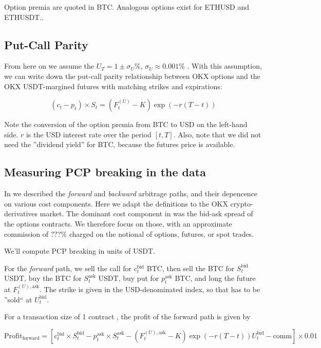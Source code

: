 \documentclass[12pt]{article}
\begin{document}
Option premia are quoted in BTC. Analogous options exist for ETHUSD and ETHUSDT.\citet{okx_options}.

\subsection{Put-Call Parity}

From here on we assume the $U_T=1 \pm \sigma_U\%$, $\sigma_U\approx0.001\%$ \citet{usd_vs_usdt}. With this assumption, we can write down the put-call parity relationship between OKX options and the OKX USDT-margined futures with matching strikes and expirations:

\begin{equation}
(c_t - p_t)\times S_t = (F^{(U)}_t - K)\exp\left(-r(T-t)\right)
\end{equation}

Note the conversion of the option premia from BTC to USD on the left-hand side. $r$ is the USD interest rate over the period $[t,T]$. Also, note that we did not need the ''dividend yield'' for BTC, because the futures price is available.


\subsection{Measuring PCP breaking in the data}

In \citet{pcpb_frl1} we described the \textit{forward} and \textit{backward} arbitrage paths, and their depencence on various cost components. Here we adapt the definitions to the OKX crypto-derivatives market. The dominant cost component in \citet{pcpb_frl1} was the bid-ask spread of the options contracts. We therefore focus on those, with an approximate commission of $???\%$ charged on the notional of options, futures, or spot trades.

We'll compute PCP breaking in units of USDT.

For the \textit{forward} path, we sell the call for $c_t^\text{bid}$ BTC, then sell the BTC for $S_t^\text{bid}$ USDT, buy the BTC for $S_t^\text{ask}$ USDT, buy put for $p_t^\text{ask}$ BTC, and long the future at $F^{(U),\text{ask}}_t$. The strike is given in the USD-denominated index, so that has to be ''sold`` at $U_t^\text{bid}$.

For a transaction size of 1 contract , the profit of the forward path is given by

\begin{equation}
    \text{Profit}_\text{forward} = \left[ c_t^\text{bid}\times S_t^\text{bid} - p_t^\text{ask}\times S_t^\text{ask} - (F^{(U),\text{ask}}_t - K)\exp\left(-r(T-t)\right) U_t^\text{bid} - \text{comm} \right] \times 0.01
\end{equation}
\end{document}
